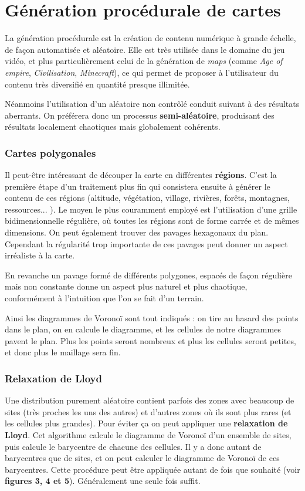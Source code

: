 \documentclass[a4paper, 10pt]{article}
\begin{document}
\section{Génération procédurale de cartes}  
  
La génération procédurale est la création de contenu numérique à grande échelle, de façon automatisée et aléatoire. Elle est très utilisée dans le domaine du jeu vidéo, et plus particulièrement celui de la génération de \textit{maps} (comme \textit{Age of empire}, \textit{Civilisation}, \textit{Minecraft}), ce qui permet de proposer à l'utilisateur du contenu très diversifié en quantité presque illimitée.  
  
Néanmoins l'utilisation d'un aléatoire non contrôlé conduit suivant à des résultats aberrants. On préférera donc un processus \textbf{semi-aléatoire}, produisant des résultats localement chaotiques mais globalement cohérents.  

\subsubsection{Cartes polygonales}
  
Il peut-être intéressant de découper la carte en différentes \textbf{régions}. C'est la première étape d'un traitement plus fin qui consistera ensuite à générer le contenu de ces régions (altitude, végétation, village, rivières, forêts, montagnes, ressources... ). Le moyen le plus couramment employé est l'utilisation d'une grille bidimensionnelle régulière, où toutes les régions sont de forme carrée et de mêmes dimensions. On peut également trouver des pavages hexagonaux du plan. Cependant la régularité trop importante de ces pavages peut donner un aspect irréaliste à la carte.  
  
En revanche un pavage formé de différents polygones, espacés de façon régulière mais non constante donne un aspect plus naturel et plus chaotique, conformément à l'intuition que l'on se fait d'un terrain.  
  
Ainsi les diagrammes de Voronoï sont tout indiqués : on tire au hasard des points dans le plan, on en calcule le diagramme, et les cellules de notre diagrammes pavent le plan. Plus les points seront nombreux et plus les cellules seront petites, et donc plus le maillage sera fin.  
  
\subsubsection{Relaxation de Lloyd}
Une distribution purement aléatoire contient parfois des zones avec beaucoup de sites (très proches les uns des autres) et d'autres zones où ils sont plus rares (et les cellules plus grandes). Pour éviter ça on peut appliquer une \textbf{relaxation de Lloyd}. Cet algorithme calcule le diagramme de Voronoï d'un ensemble de sites, puis calcule le barycentre de chacune des cellules. Il y a donc autant de barycentres que de sites, et on peut calculer le diagramme de Voronoï de ces barycentres. Cette procédure peut être appliquée autant de fois que souhaité (voir \textbf{figures 3, 4 et 5}). Généralement une seule fois suffit.  
  
\end{document}
